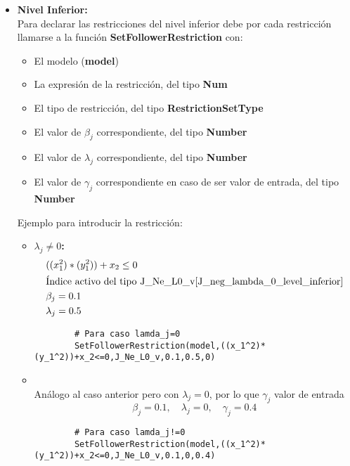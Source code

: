\begin{itemize}
\item \textbf{Nivel Inferior:}\\
Para declarar las restricciones del nivel inferior debe por cada restricción
llamarse a la función \textbf{SetFollowerRestriction} con:
\begin{itemize}
   \item El modelo (\textbf{model})
   \item La expresión de la restricción, del tipo \textbf{Num}
   \item El tipo de restricción, del tipo \textbf{RestrictionSetType}
   \item El valor de $\beta_j$ correspondiente, del tipo \textbf{Number}
   \item El valor de $\lambda_j$ correspondiente, del tipo \textbf{Number}
   \item El valor de $\gamma_j$ correspondiente en caso de ser valor de entrada, del tipo \textbf{Number}
\end{itemize}


Ejemplo para introducir la restricción:

\begin{itemize}
    
    \item \textbf{$ \lambda_j \neq 0$:}\\
    \begin{align*}
        &((x_1^2)*(y_1^2))+x_2 \leq 0\\
        &\text{Índice activo del tipo J\_Ne\_L0\_v} \ref{J_neg_lambda_0_level_inferior}\\
        & \beta_j=0.1\\
        & \lambda_j=0.5 \\
    \end{align*}
    \begin{lstlisting}
        # Para caso lamda_j=0
        SetFollowerRestriction(model,((x_1^2)*(y_1^2))+x_2<=0,J_Ne_L0_v,0.1,0.5,0)
    \end{lstlisting}
    

    
   
    \item {}\\
    
    Análogo al caso anterior pero con $\lambda_j=0$, por lo que $\gamma_j$ valor de entrada
    \begin{equation*}
        \beta_j=0.1, \quad \lambda_j=0, \quad \gamma_j=0.4
    \end{equation*}
    \begin{lstlisting}
        # Para caso lamda_j!=0
        SetFollowerRestriction(model,((x_1^2)*(y_1^2))+x_2<=0,J_Ne_L0_v,0.1,0,0.4)
    \end{lstlisting}

\end{itemize}


\end{itemize}


